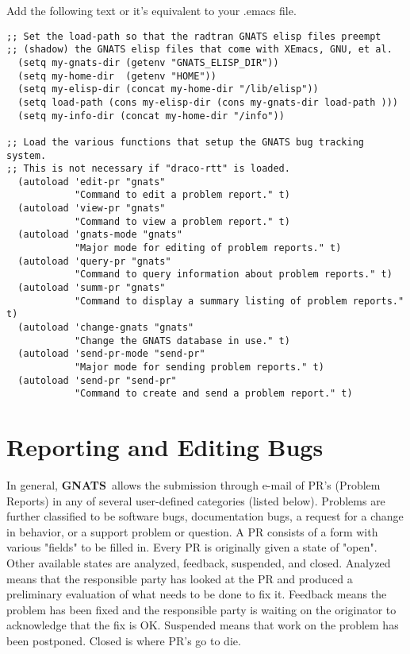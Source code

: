 \documentclass[11pt]{nmemo}
\newcommand{\gnats}{{\normalfont\bfseries GNATS}}
\begin{document}
Add the following text or it's equivalent to your .emacs file.
 \begin{verbatim}
;; Set the load-path so that the radtran GNATS elisp files preempt
;; (shadow) the GNATS elisp files that come with XEmacs, GNU, et al.
  (setq my-gnats-dir (getenv "GNATS_ELISP_DIR"))
  (setq my-home-dir  (getenv "HOME"))
  (setq my-elisp-dir (concat my-home-dir "/lib/elisp"))
  (setq load-path (cons my-elisp-dir (cons my-gnats-dir load-path )))
  (setq my-info-dir (concat my-home-dir "/info"))

;; Load the various functions that setup the GNATS bug tracking system.
;; This is not necessary if "draco-rtt" is loaded.
  (autoload 'edit-pr "gnats"
            "Command to edit a problem report." t)
  (autoload 'view-pr "gnats"
            "Command to view a problem report." t)
  (autoload 'gnats-mode "gnats"
            "Major mode for editing of problem reports." t)
  (autoload 'query-pr "gnats"
            "Command to query information about problem reports." t)
  (autoload 'summ-pr "gnats"
            "Command to display a summary listing of problem reports." t)
  (autoload 'change-gnats "gnats"
            "Change the GNATS database in use." t)
  (autoload 'send-pr-mode "send-pr"
            "Major mode for sending problem reports." t)
  (autoload 'send-pr "send-pr"
            "Command to create and send a problem report." t)

\end{verbatim}

\section{Reporting and Editing Bugs }

In general, \gnats\ allows the submission through e-mail of PR's (Problem Reports)
in any of several user-defined categories (listed below). Problems 
are further classified  to 
be software bugs, documentation bugs, a request for a change in behavior,
or a support problem or question. A PR consists of a form with
various "fields" to be filled in. Every PR is originally given a
state of "open". Other available states are analyzed, feedback, suspended, and
closed. Analyzed means that the responsible party has looked at the
PR and produced a preliminary evaluation of what needs to be done
to fix it. Feedback means the problem has been fixed and the responsible
party is waiting on the originator to acknowledge that the fix is OK.
Suspended means that work on the problem has been postponed.
Closed is where PR's go to die.
\end{document}
